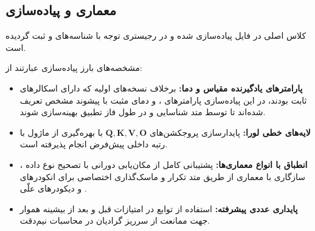 \subsection{معماری و پیاده‌سازی}
کلاس اصلی  در فایل  پیاده‌سازی شده و در رجیستری توجه با شناسه‌های  و  ثبت گردیده است.

مشخصه‌های بارز پیاده‌سازی عبارتند از:
\begin{itemize}
    \item \textbf{پارامترهای یادگیرنده مقیاس و دما:} برخلاف نسخه‌های اولیه که دارای اسکالرهای ثابت بودند، در این پیاده‌سازی پارامترهای ،  و دمای مثبت  با پیشوند مشخص تعریف شده‌اند تا توسط متد  شناسایی و در طول فاز تطبیق بهینه‌سازی شوند.
    \item \textbf{لایه‌های خطی لورا:} پایدارسازی پروجکشن‌های $\mathbf{Q}, \mathbf{K}, \mathbf{V}, \mathbf{O}$ با بهره‌گیری از ماژول  با رتبه داخلی پیش‌فرض  انجام پذیرفته است.
    \item \textbf{انطباق با انواع معماری‌ها:} پشتیبانی کامل از مکان‌یابی دورانی  با تصحیح نوع داده ، سازگاری با معماری  از طریق متد تکرار  و ماسک‌گذاری اختصاصی برای انکودرهای  و دیکودرهای علّی .
    \item \textbf{پایداری عددی پیشرفته:} استفاده از توابع  در امتیازات قبل و بعد از بیشینه هموار جهت ممانعت از سرریز گرادیان در محاسبات نیم‌دقت.
\end{itemize}
